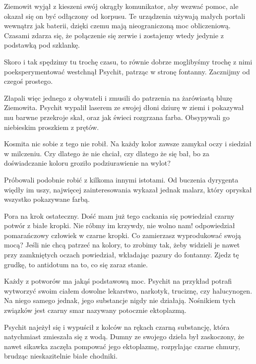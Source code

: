 Ziemowit wyjął z kieszeni swój okrągły komunikator, aby wezwać pomoc, ale okazał się on być odłączony od korpusu.
Te urządzenia używają małych portali wewnątrz jak baterii, dzięki czemu mają nieograniczoną moc obliczeniową.
Czasami zdarza się, że połączenie się zerwie i zostajemy wtedy jedynie z podstawką pod szklankę.

\divider{}

\begin{dialogue}
\ds{} Skoro i tak spędzimy tu trochę czasu, to równie dobrze moglibyśmy trochę z nimi poeksperymentować \dm{} westchnął Psychit, patrząc w stronę fontanny. \dm{}
Zacznijmy od czegoś prostego.
\end{dialogue}

Złapali więc jednego z obywateli i zmusili do patrzenia na żarówiastą bluzę Ziemowita.
Psychit wypalił laserem ze swojej dłoni dziurę w ziemi i pokazywał mu barwne przekroje skał, oraz jak świeci rozgrzana farba.
Obsypywali go niebieskim proszkiem z prętów.

Kosmita nic sobie z tego nie robił. 
Na każdy kolor zawsze zamykał oczy i siedział w milczeniu.
Czy dlatego że nie chciał, czy dlatego że się bał, bo za doświadczanie koloru groziło podziurawienie na wylot?

Próbowali podobnie robić z kilkoma innymi istotami.
Od buczenia dyrygenta więdły im uszy, najwięcej zainteresowania wykazał jednak malarz, który opryskał wszystko pokazywane farbą.

\begin{dialogue}
\ds{} Pora na krok ostateczny. Dość mam już tego cackania się \dm{} powiedział czarny potwór z białe kropki.
\ds{} Nie róbmy im krzywdy, nie wolno nam! \dm{} odpowiedział pomarańczowy człowiek w czarne kropki. \dm{} Co zamierzasz wyprodukować swoją mocą?
\ds{} Jeśli nie chcą patrzeć na kolory, to zrobimy tak, żeby widzieli je nawet przy zamkniętych oczach \ds{} powiedział, wkładając pazury do fontanny. \dm{}
Zjedz tę grudkę, to antidotum na to, co się zaraz stanie.
\end{dialogue}

Każdy z potworów ma jakąś podstawową moc. Psychit na przykład potrafi wytworzyć swoim ciałem dowolne lekarstwo, narkotyk, truciznę, czy halucynogen. 
Na niego samego jednak, jego substancje nigdy nie działają.
Nośnikiem tych związków jest czarny smar nazywany potocznie ektoplazmą.

Psychit najeżył się i wypuścił z kolców na rękach czarną substancję, która natychmiast zmieszała się z wodą.
Dumny ze swojego dzieła był zaskoczony, że nawet sikawka zaczęła pompować jego ektoplazmę, rozpylając czarne chmury, brudząc nieskazitelnie białe chodniki.

